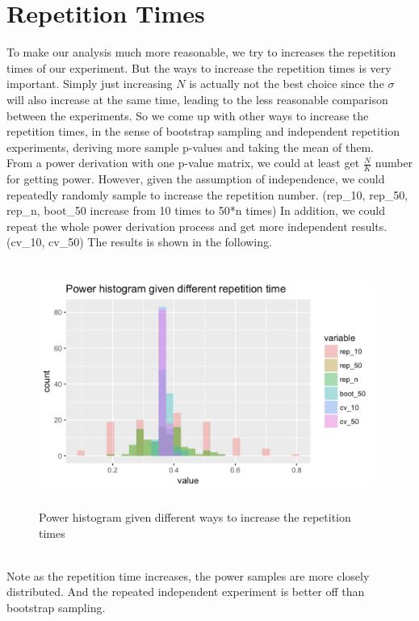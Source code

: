 \documentclass[10pt,english]{article}\usepackage{graphicx, color}
\numberwithin{equation}{section}
\numberwithin{figure}{section}
\begin{document}
\section{Repetition Times}
To make our analysis much more reasonable, we try to increases the repetition times of our experiment. But the ways to increase the repetition times is very important. Simply just increasing $N$ is actually not the best choice since the $\sigma$ will also increase at the same time, leading to the less reasonable comparison between the experiments. So we come up with other ways to increase the repetition times, in the sense of bootstrap sampling and independent repetition experiments, deriving more sample p-values and taking the mean of them. \\
From a power derivation with one p-value matrix, we could at least get $\frac{N}{K}$ number for getting power. However, given the assumption of independence, we could repeatedly randomly sample to increase the repetition number. (rep\_10, rep\_50, rep\_n, boot\_50 increase from 10 times to 50*n times) In addition, we could repeat the whole power derivation process and get more independent results. (cv\_10, cv\_50) The results is shown in the following.
\begin{figure}[htbp]
\centering\includegraphics[width=11cm,height=8cm]{hist}
\caption{Power histogram given different ways to increase the repetition times}
\end{figure}
\quad\\
Note as the repetition time increases, the power samples are more closely distributed. And the repeated independent experiment is better off than bootstrap sampling. \\
\end{document}
